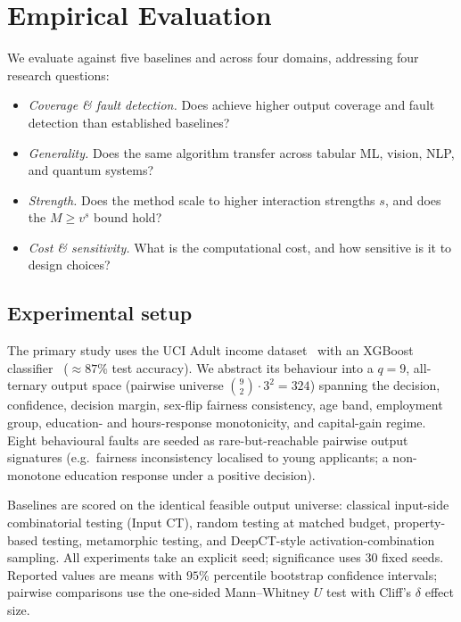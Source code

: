 \section{Empirical Evaluation}
\label{sec:eval}

We evaluate \rnwise{} against five baselines and across four domains, addressing
four research questions:
\begin{itemize}
\item[\textbf{RQ1}] \emph{Coverage \& fault detection.} Does \rnwise{} achieve
higher output coverage and fault detection than established baselines?
\item[\textbf{RQ2}] \emph{Generality.} Does the same algorithm transfer across
tabular ML, vision, NLP, and quantum systems?
\item[\textbf{RQ3}] \emph{Strength.} Does the method scale to higher interaction
strengths $s$, and does the $M\ge v^{s}$ bound hold?
\item[\textbf{RQ4}] \emph{Cost \& sensitivity.} What is the computational cost,
and how sensitive is it to design choices?
\end{itemize}

\subsection{Experimental setup}
The primary study uses the UCI Adult income dataset~\cite{dua2019uci} with an
XGBoost classifier~\cite{chen2016xgboost} ($\approx 87\%$ test accuracy). We
abstract its behaviour into a $q=9$, all-ternary output space (pairwise universe
$\binom{9}{2}\cdot 3^{2}=324$) spanning the decision, confidence, decision margin,
sex-flip fairness consistency, age band, employment group, education- and
hours-response monotonicity, and capital-gain regime. Eight behavioural faults are
seeded as rare-but-reachable pairwise output signatures (e.g.\ fairness
inconsistency localised to young applicants; a non-monotone education response
under a positive decision).

Baselines are scored on the identical feasible output universe: classical
input-side combinatorial testing (Input CT), random testing at matched budget,
property-based testing, metamorphic testing, and DeepCT-style
activation-combination sampling. All experiments take an explicit seed;
significance uses 30 fixed seeds. Reported values are means with $95\%$ percentile
bootstrap confidence intervals; pairwise comparisons use the one-sided
Mann--Whitney $U$ test with Cliff's $\delta$ effect size.

